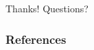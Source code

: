 \documentclass[12pt]{beamer}
\begin{document}



\begin{frame}
\begin{center}
\LARGE{Thanks! Questions?}
\end{center}
\end{frame}





\begin{frame}[allowframebreaks]
	\frametitle{References}
	\scriptsize 
%	
%	
%

%	
\end{frame}
\end{document}
